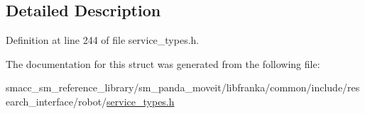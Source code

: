 \subsection{Detailed Description}


Definition at line 244 of file service\+\_\+types.\+h.



The documentation for this struct was generated from the following file\+:\begin{DoxyCompactItemize}
\item 
smacc\+\_\+sm\+\_\+reference\+\_\+library/sm\+\_\+panda\+\_\+moveit/libfranka/common/include/research\+\_\+interface/robot/\hyperlink{service__types_8h}{service\+\_\+types.\+h}\end{DoxyCompactItemize}
